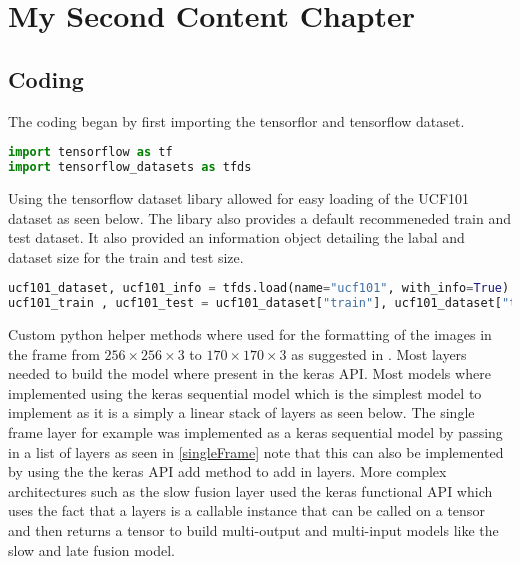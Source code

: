 \chapter{My Second Content Chapter}
\label{chapterlabel3}

\section{Coding}

     
The coding began by first importing the tensorflor and tensorflow dataset.

\begin{lstlisting}[language=Python, caption=Importing tensorflow libaries]
import tensorflow as tf
import tensorflow_datasets as tfds
\end{lstlisting}

Using the tensorflow dataset libary allowed for easy loading of the UCF101 dataset as seen below. The libary also provides a default recommeneded train and test dataset. It also provided an information object detailing the labal and dataset size for the train and test size. 
     
\begin{lstlisting}[language=Python, caption=Loading UCF101 dataset]
ucf101_dataset, ucf101_info = tfds.load(name="ucf101", with_info=True)
ucf101_train , ucf101_test = ucf101_dataset["train"], ucf101_dataset["test"]
\end{lstlisting}


Custom python helper methods where used for the formatting of the images in the frame from $256 \times 256 \times 3$ to $170 \times170 \times 3$ as suggested in \citep{KarpathyCVPR14}. Most layers needed to build the model where present in the keras API. Most models where implemented using the keras sequential model which is the simplest model to implement as it is a simply a linear stack of layers as seen below. The single frame layer for example was implemented as a keras sequential model by passing in a list of layers as seen in \ref{singleFrame} note that this can also be implemented by using the the keras API add method to add in layers. More complex architectures such as the slow fusion layer used the keras functional API which uses the fact that a layers is a callable instance that can be called on a tensor and then returns a tensor to build multi-output and multi-input models like the slow and late fusion model.


